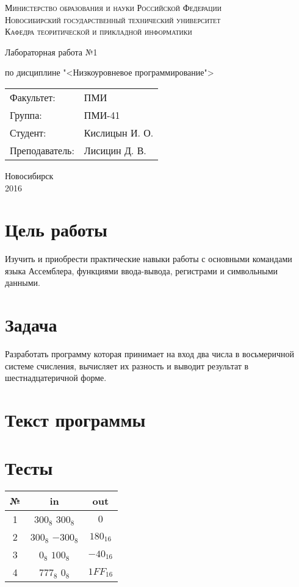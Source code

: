 \documentclass[oneside, final, 12pt]{extarticle}
\begin{document}
\begin{titlepage}
	\begin{centering}
		\textsc{Министерство образования и науки Российской Федерации}\\
		\textsc{Новосибирский государственный технический университет}\\
		\textsc{Кафедра теоритической и прикладной информатики}\\
	\end{centering}
	\vfill
	\vfill
	\vfill
	\Large
	\centerline{Лабораторная работа №1}
	\centerline{по дисциплине "<Низкоуровневое программирование">}
	\normalsize
	\vfill
	\vfill
	\vfill
	\begin{flushleft}
		\begin{minipage}{0.3\textwidth}
			\begin{tabular}{l l}
				Факультет: & ПМИ\\
				Группа: & ПМИ-41\\
				Студент: & Кислицын И. О.\\
				Преподаватель: & Лисицин Д. В.
			\end{tabular}
		\end{minipage}
	\end{flushleft}
	\vfill
	\vfill
	\begin{centering}
		Новосибирск\\
		2016\\
	\end{centering}
\end{titlepage}
\setcounter{page}{2}
\section{Цель работы}
Изучить и приобрести практические навыки работы с основными командами языка Ассемблера, функциями ввода-вывода, регистрами и символьными данными.
\section{Задача}
Разработать программу которая принимает на вход два числа в восьмеричной системе счисления, вычисляет их разность и выводит результат в шестнадцатеричной форме.
\section{Текст программы}

\section{Тесты}
\begin{tabular}{|c|c|c|} \hline
	\bf№ & \bf in & \bf out \\ \hline
	1 & \(300_8\) \(300_8\) & \(0\) \\ \hline
	2 & \(300_8\) \(-300_8\) & \(180_{16}\) \\ \hline
	3 & \(0_8\) \(100_8\) & \(-40_{16}\) \\ \hline
	4 & \(777_8\) \(0_8\) & \(1FF_{16}\) \\ \hline
\end{tabular}
\end{document}
